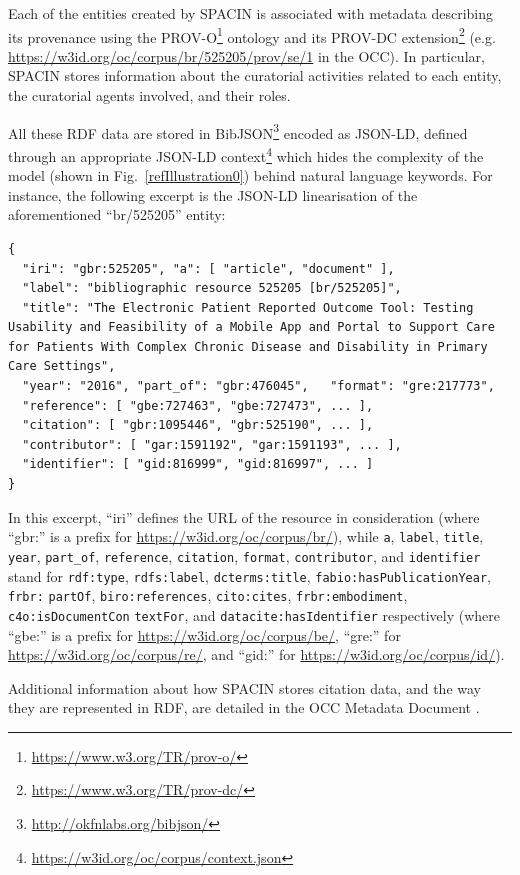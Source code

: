 \documentclass[runningheads,a4paper]{llncs}
\begin{document}
Each of the entities created by SPACIN is associated with metadata describing its provenance using the PROV-O\footnote{\url{https://www.w3.org/TR/prov-o/}} ontology and its PROV-DC extension\footnote{\url{https://www.w3.org/TR/prov-dc/}} (e.g. \url{https://w3id.org/oc/corpus/br/525205/prov/se/1} in the OCC). In particular, SPACIN stores information about the curatorial activities related to each entity, the curatorial agents involved, and their roles. 

All these RDF data are stored in BibJSON\footnote{\url{http://okfnlabs.org/bibjson/}} encoded as JSON-LD, defined through an appropriate JSON-LD context\footnote{\url{https://w3id.org/oc/corpus/context.json}} which hides the complexity of the model (shown in Fig.~\ref{refIllustration0}) behind natural language keywords. For instance, the following excerpt is the JSON-LD linearisation of the aforementioned ``br/525205'' entity:

\begin{lstlisting}[mathescape]
{
  "iri": "gbr:525205", "a": [ "article", "document" ], 
  "label": "bibliographic resource 525205 [br/525205]", 
  "title": "The Electronic Patient Reported Outcome Tool: Testing Usability and Feasibility of a Mobile App and Portal to Support Care for Patients With Complex Chronic Disease and Disability in Primary Care Settings", 
  "year": "2016", "part_of": "gbr:476045",   "format": "gre:217773", 
  "reference": [ "gbe:727463", "gbe:727473", ... ], 
  "citation": [ "gbr:1095446", "gbr:525190", ... ], 
  "contributor": [ "gar:1591192", "gar:1591193", ... ], 
  "identifier": [ "gid:816999", "gid:816997", ... ]
}
\end{lstlisting}

In this excerpt, ``iri'' defines the URL of the resource in consideration (where ``gbr:'' is a prefix for \url{https://w3id.org/oc/corpus/br/}), while \Verb+a+, \Verb+label+, \Verb+title+, \Verb+year+, \Verb+part_of+, \Verb+reference+, \Verb+citation+, \Verb+format+, \Verb+contributor+, and \Verb+identifier+ stand for \Verb+rdf:type+, \Verb+rdfs:label+, \Verb+dcterms:title+, \Verb+fabio:hasPublicationYear+, \Verb+frbr:+ \Verb+partOf+, \Verb+biro:references+, \Verb+cito:cites+, \Verb+frbr:embodiment+, \Verb+c4o:isDocumentCon+ \Verb+textFor+, and \Verb+datacite:hasIdentifier+ respectively (where ``gbe:'' is a prefix for \url{https://w3id.org/oc/corpus/be/}, ``gre:'' for \url{https://w3id.org/oc/corpus/re/}, and ``gid:'' for \url{https://w3id.org/oc/corpus/id/}).

Additional information about how SPACIN stores citation data, and the way they are represented in RDF, are detailed in the OCC Metadata Document  \cite{__RefNumPara__14748_1591320820}.
\end{document}
